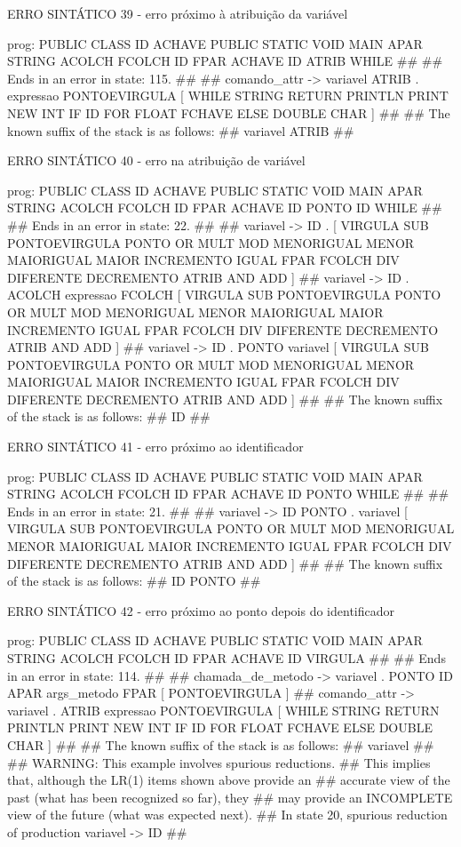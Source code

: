 \documentclass[12pt,a4paper,twoside]{report}
\begin{document}
\begin{terminal}
ERRO SINTÁTICO 39 - erro próximo à atribuição da variável
 
prog: PUBLIC CLASS ID ACHAVE PUBLIC STATIC VOID MAIN APAR STRING ACOLCH FCOLCH ID FPAR ACHAVE ID ATRIB WHILE 
##
## Ends in an error in state: 115.
##
## comando_attr -> variavel ATRIB . expressao PONTOEVIRGULA [ WHILE STRING RETURN PRINTLN PRINT NEW INT IF ID FOR FLOAT FCHAVE ELSE DOUBLE CHAR ]
##
## The known suffix of the stack is as follows:
## variavel ATRIB 
##

ERRO SINTÁTICO 40 -  erro na atribuição de variável
 
prog: PUBLIC CLASS ID ACHAVE PUBLIC STATIC VOID MAIN APAR STRING ACOLCH FCOLCH ID FPAR ACHAVE ID PONTO ID WHILE 
##
## Ends in an error in state: 22.
##
## variavel -> ID . [ VIRGULA SUB PONTOEVIRGULA PONTO OR MULT MOD MENORIGUAL MENOR MAIORIGUAL MAIOR INCREMENTO IGUAL FPAR FCOLCH DIV DIFERENTE DECREMENTO ATRIB AND ADD ]
## variavel -> ID . ACOLCH expressao FCOLCH [ VIRGULA SUB PONTOEVIRGULA PONTO OR MULT MOD MENORIGUAL MENOR MAIORIGUAL MAIOR INCREMENTO IGUAL FPAR FCOLCH DIV DIFERENTE DECREMENTO ATRIB AND ADD ]
## variavel -> ID . PONTO variavel [ VIRGULA SUB PONTOEVIRGULA PONTO OR MULT MOD MENORIGUAL MENOR MAIORIGUAL MAIOR INCREMENTO IGUAL FPAR FCOLCH DIV DIFERENTE DECREMENTO ATRIB AND ADD ]
##
## The known suffix of the stack is as follows:
## ID 
##

ERRO SINTÁTICO 41 -  erro próximo ao identificador

prog: PUBLIC CLASS ID ACHAVE PUBLIC STATIC VOID MAIN APAR STRING ACOLCH FCOLCH ID FPAR ACHAVE ID PONTO WHILE 
##
## Ends in an error in state: 21.
##
## variavel -> ID PONTO . variavel [ VIRGULA SUB PONTOEVIRGULA PONTO OR MULT MOD MENORIGUAL MENOR MAIORIGUAL MAIOR INCREMENTO IGUAL FPAR FCOLCH DIV DIFERENTE DECREMENTO ATRIB AND ADD ]
##
## The known suffix of the stack is as follows:
## ID PONTO 
##

ERRO SINTÁTICO 42 -  erro próximo ao ponto depois do identificador

prog: PUBLIC CLASS ID ACHAVE PUBLIC STATIC VOID MAIN APAR STRING ACOLCH FCOLCH ID FPAR ACHAVE ID VIRGULA 
##
## Ends in an error in state: 114.
##
## chamada_de_metodo -> variavel . PONTO ID APAR args_metodo FPAR [ PONTOEVIRGULA ]
## comando_attr -> variavel . ATRIB expressao PONTOEVIRGULA [ WHILE STRING RETURN PRINTLN PRINT NEW INT IF ID FOR FLOAT FCHAVE ELSE DOUBLE CHAR ]
##
## The known suffix of the stack is as follows:
## variavel 
##
## WARNING: This example involves spurious reductions.
## This implies that, although the LR(1) items shown above provide an
## accurate view of the past (what has been recognized so far), they
## may provide an INCOMPLETE view of the future (what was expected next).
## In state 20, spurious reduction of production variavel -> ID 
##


\end{terminal}
\end{document}
